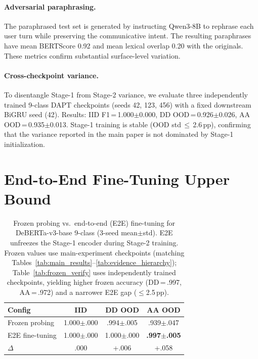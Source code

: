 \paragraph{Adversarial paraphrasing.}
The paraphrased test set is generated by instructing Qwen3-8B to rephrase each user turn while preserving the communicative intent. The resulting paraphrases have mean BERTScore 0.92 and mean lexical overlap 0.20 with the originals. These metrics confirm substantial surface-level variation.

\paragraph{Cross-checkpoint variance.}
To disentangle Stage-1 from Stage-2 variance, we evaluate three independently trained 9-class DAPT checkpoints (seeds 42, 123, 456) with a fixed downstream BiGRU seed (42). Results: IID F1\,=\,1.000$\pm$0.000, DD OOD\,=\,0.926$\pm$0.026, AA OOD\,=\,0.935$\pm$0.013. Stage-1 training is stable (OOD std\,$\leq$\,2.6\,pp), confirming that the variance reported in the main paper is not dominated by Stage-1 initialization.

\section{End-to-End Fine-Tuning Upper Bound}
\label{app:e2e}

\begin{table}[ht]
\centering
\footnotesize
\caption{Frozen probing vs.\ end-to-end (E2E) fine-tuning for DeBERTa-v3-base 9-class (3-seed mean$\pm$std). E2E unfreezes the Stage-1 encoder during Stage-2 training. Frozen values use main-experiment checkpoints (matching Tables~\ref{tab:main_results}--\ref{tab:evidence_hierarchy}); Table~\ref{tab:frozen_verify} uses independently trained checkpoints, yielding higher frozen accuracy (DD\,=\,.997, AA\,=\,.972) and a narrower E2E gap ($\leq$2.5\,pp).}
\label{tab:e2e}
\begin{tabular}{@{}lccc@{}}
\toprule
\textbf{Config} & IID & DD OOD & AA OOD \\
\midrule
Frozen probing & 1.000$\pm$.000 & .994$\pm$.005 & .939$\pm$.047 \\
E2E fine-tuning & 1.000$\pm$.000 & 1.000$\pm$.000 & \textbf{.997$\pm$.005} \\
\midrule
$\Delta$ & .000 & +.006 & +.058 \\
\bottomrule
\end{tabular}
\end{table}


